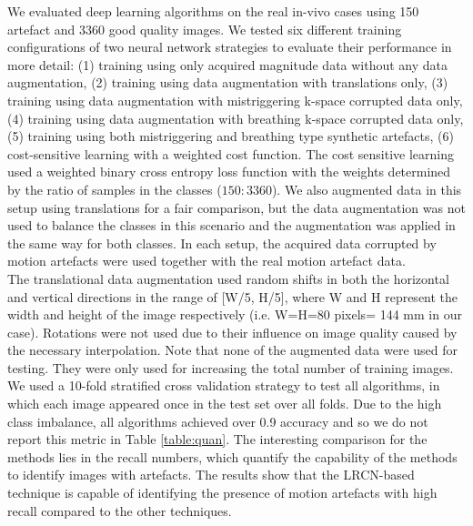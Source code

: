 \documentclass[preprint,12pt,authoryear]{elsarticle}
\begin{document}
We evaluated deep learning algorithms on the real in-vivo cases using 150 artefact and 3360 good quality  images. We tested six different training configurations of two neural network strategies to evaluate their performance in more detail: (1) training using only acquired magnitude data without any data augmentation, (2) training using data augmentation with translations only, (3) training using data augmentation with mistriggering k-space corrupted data only, (4) training using data augmentation with breathing k-space corrupted data only, (5) training using both mistriggering and breathing type synthetic artefacts, (6) cost-sensitive learning with a weighted cost function.  The cost sensitive learning used a weighted binary cross entropy loss function with the weights determined by the ratio of samples in the classes ($150:3360$). We also augmented data in this setup using translations for a fair comparison, but the data augmentation was not used to balance the classes in this scenario and the augmentation was applied in the same way for both classes. In each setup, the acquired data corrupted by motion artefacts were used together with the real motion artefact data.\\

The translational data augmentation used random shifts in both the horizontal and vertical directions in the range of [W/5, H/5], where W and H represent the width and height of the image respectively (i.e. W=H=80 pixels= 144 mm in our case). Rotations were not used due to their influence on image quality caused by the necessary interpolation. Note that none of the augmented data were used for testing. They were only used for increasing the total number of training images.\\

We used a 10-fold stratified cross validation strategy to test all algorithms, in which each image appeared once in the test set over all folds. Due to the high class imbalance, all algorithms achieved over 0.9 accuracy and so we do not report this metric in Table \ref{table:quan}. %
The interesting comparison for the methods lies in the recall numbers, which quantify the capability of the methods to identify images with artefacts. The results show that the LRCN-based technique is capable of identifying the presence of motion artefacts with high recall compared to the other techniques. 
\end{document}
